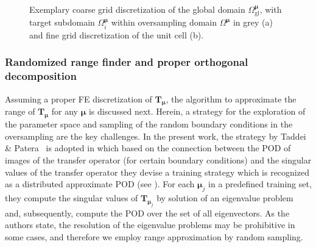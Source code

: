 \documentclass[a4paper]{eccomas_paper-2024}
\newcommand{\m}{\bm\mu}
\newcommand{\gl}{\mathrm{gl}}
\begin{document}
\begin{figure}
    \centering
    
    \caption{Exemplary coarse grid discretization of the global domain $\varOmega^{\m}_{\gl}$, with target subdomain $\varOmega^{\m}_i$ within oversampling domain $\varOmega^{\m}$ in grey (a) and fine grid discretization of the unit cell (b).}\label{fig:oversampling_domain}
\end{figure}


\subsubsection{Randomized range finder and proper orthogonal decomposition} %
\label{sec:Randomized range finder and POD}

Assuming a proper FE discretization of $\bm{T}_{\m}$, the algorithm to approximate the range of $\bm{T}_{\m}$ for any $\m$ is discussed next.
Herein, a strategy for the exploration of the parameter space and sampling of the random boundary conditions in the oversampling are the key challenges.
In the present work, the strategy by Taddei \& Patera~\cite{Taddei2018Localization} is adopted in which based on the connection between the POD of images of the transfer operator (for certain boundary conditions) and the singular values of the transfer operator they devise a training strategy which is recognized as a distributed approximate POD (see \cite{Himpe2018Hierarchical}).
For each $\m_j$ in a predefined training set, they compute the singular values of $\bm{T}_{\m_j}$ by solution of an eigenvalue problem and, subsequently, compute the POD over the set of all eigenvectors.
As the authors state, the resolution of the eigenvalue problems may be prohibitive in some cases, and therefore we employ range approximation by random sampling.
\end{document}

